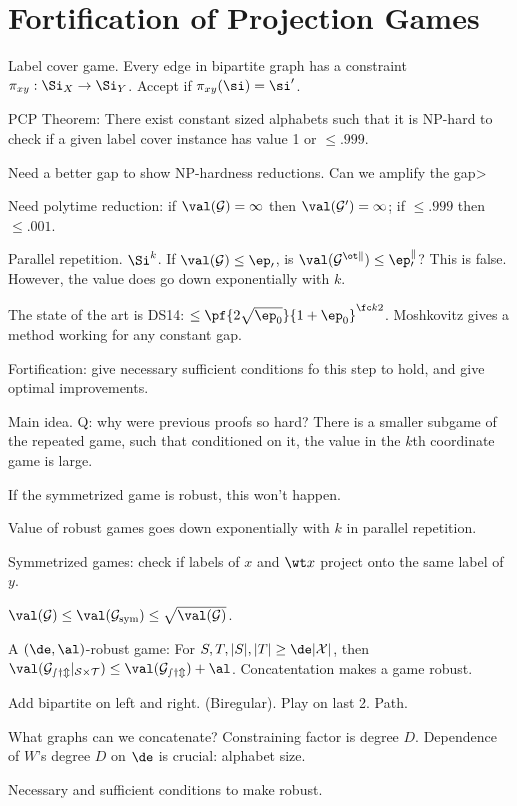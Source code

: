 \section{Fortification of Projection Games}

Label cover game. Every edge in bipartite graph has a constraint $\pi_{xy}:\Si_X\to \Si_Y$. Accept if $\pi_{xy}(\si)=\si'$.

PCP Theorem: There exist constant sized alphabets such that it is NP-hard to check if a given label cover instance has value 1 or $\le .999$. 

Need a better gap to show NP-hardness reductions. Can we amplify the gap>

Need polytime reduction: if $\val(\cal G)=1$ then $\val(\cal G')=1$; if $\le .999$ then $\le .001$. 

Parallel repetition. $\Si^k$. If $\val(\cal G)\le \ep_0$, is $\val(\cal G^{\ot k})\le \ep_0^k$? This is false. However, the value does go down exponentially with $k$.

The state of the art is DS14: $\le \pf{2\sqrt{\ep_0}}{1+\ep_0}^{\fc k2}$. Moshkovitz gives a method working for any constant gap.

Fortification: give necessary sufficient conditions fo this step to hold, and give optimal improvements.

Main idea. Q: why were previous proofs so hard? There is a smaller subgame of the repeated game, such that conditioned on it, the value in the $k$th coordinate game is large.

If the symmetrized game is robust, this won't happen.

Value of robust games goes down exponentially with $k$ in parallel repetition. 

Symmetrized games: check if labels of $x$ and $\wt x$ project onto the same label of $y$.

$\val(\cal G)\le \val(\cal G_{\text{sym}})\le \sqrt{\val(\cal G)}$.

A $(\de,\al)$-robust game: For $S,T, |S|,|T|\ge \de|\cal X|$, then $\val(\cal G_{sym}|_{S\times T})\le \val(\cal G_{sym})+\al$.
Concatentation makes a game robust.

Add bipartite on left and right. (Biregular). Play on last 2. Path.

What graphs can we concatenate? Constraining factor is degree $D$. Dependence of $W$'s degree $D$ on $\de$ is crucial: alphabet size.

Necessary and sufficient conditions to make robust.

